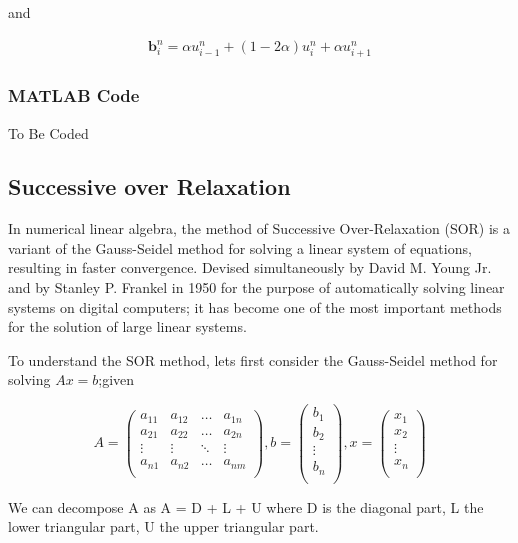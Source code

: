 \documentclass[11pt]{article}
\begin{document}
and

\begin{align*}
    \mathbf{b}_i^n=\alpha u_{i-1}^n+(1-2\alpha )u_i^n+\alpha u_{i+1}^n
\end{align*}



\subsubsection{MATLAB Code}

To Be Coded

\subsection{Successive over Relaxation}
In numerical linear algebra, the method of Successive Over-Relaxation (SOR) is a variant of the Gauss-Seidel method for solving a linear system of equations, resulting in faster convergence. Devised simultaneously by David M. Young Jr. and by Stanley P. Frankel in 1950 for the purpose of automatically solving linear systems on digital computers; it has become one of the most important methods for the solution of large linear systems. 

To understand the SOR method, lets first consider the Gauss-Seidel method for solving $Ax = b$;given

\[
A = \begin{pmatrix}
 a_{11} & a_{12} & \dots & a_{1n}\\
 a_{21} & a_{22} & \dots & a_{2n}\\
 \vdots & \vdots & \ddots & \vdots \\ 
 a_{n1} & a_{n2} & \dots & a_{nm} \\
\end{pmatrix}
, %
 b = \begin{pmatrix}
 b_{1} \\
 b_{2} \\
 \vdots \\ 
 b_{n} \\
\end{pmatrix}
, %
x = \begin{pmatrix}
 x_{1} \\
 x_{2} \\
 \vdots \\ 
 x_{n} \\
\end{pmatrix}
\]

We can decompose A as A = D + L + U where D is the diagonal part, L the lower triangular part, U the upper triangular part.
\end{document}

